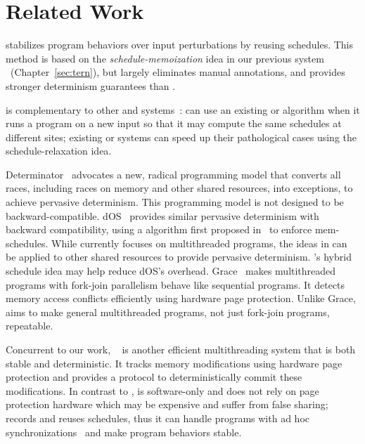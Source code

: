 \section{Related Work} \label{sec:peregrine-related}

\peregrine stabilizes program behaviors over input perturbations by reusing 
schedules. This method is based on the \emph{schedule-memoization} idea in our 
previous system \tern~(Chapter~\ref{sec:tern}), but \peregrine largely 
eliminates manual annotations, and provides stronger determinism guarantees than 
\tern.

\peregrine is complementary to other \smt and \dmt 
systems~\cite{determinator:osdi10, dthreads:sosp11, cui:tern:osdi10, 
coredet:asplos10, kendo:asplos09, dmp:asplos09}: \peregrine can use an
existing \smt or \dmt algorithm when it runs a program on a new input
so that it may compute the same schedules at different sites;
existing \smt or \dmt systems can speed up their pathological cases
using the schedule-relaxation idea.

Determinator~\cite{determinator:osdi10}
advocates a new, radical programming model that converts all races,
including races on memory and other shared resources, into exceptions, to
achieve pervasive determinism. This programming model is not designed to
be backward-compatible. dOS~\cite{dos:osdi10} provides similar pervasive
determinism with backward compatibility, using a \dmt algorithm first
proposed in~\cite{dmp:asplos09} to enforce mem-schedules.  While \peregrine
currently focuses on multithreaded programs, the ideas in \peregrine can be
applied to other shared resources to provide pervasive determinism.
\peregrine's hybrid schedule idea may help reduce dOS's overhead.  
Grace~\cite{grace:oopsla09} makes multithreaded programs with fork-join 
parallelism behave like sequential programs.  It detects memory access 
conflicts efficiently using hardware page protection.  Unlike Grace, \peregrine 
aims to make general multithreaded programs, not just fork-join programs, 
repeatable.

Concurrent to our work, \dthreads~\cite{dthreads:sosp11} is another
efficient multithreading system that is both stable and deterministic. It 
tracks memory modifications using hardware page protection and provides a 
protocol to deterministically commit these modifications. In contrast to 
\dthreads, \peregrine is software-only and does not rely on page protection 
hardware which may be expensive and suffer from false sharing; \peregrine 
records and reuses schedules, thus it can handle programs with ad hoc 
synchronizations~\cite{syncfinder:osdi10} and make program behaviors stable.

